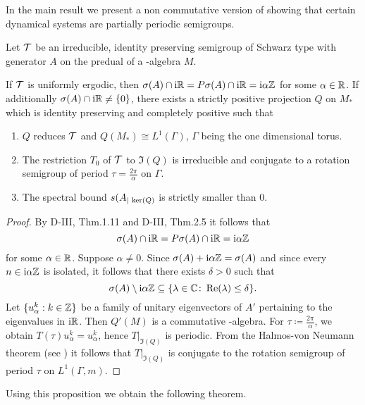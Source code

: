 In the main result we present a non commutative version of \citet{nagel:1984} showing that certain dynamical systems are partially periodic semigroups.
\begin{proposition}\label{prop:d4-3.10}
Let $ \mathcal{T} $  be an irreducible, identity preserving semigroup of Schwarz type with generator $ A $  on the predual of a \WA-algebra $ M $.

If $ \mathcal{T} $  is uniformly ergodic, then $ \sigma(A) \cap \mathrm{i}\mathbb{R} = P\sigma(A) \cap \mathrm{i}\mathbb{R} = \mathrm{i}\alpha\mathbb{Z} $  for some $ \alpha \in \mathbb{R} $.
If additionally $ \sigma(A) \cap \mathrm{i}\mathbb{R} \neq \{0\} $, there exists a strictly positive projection $ Q $  on $ M_{*} $  which is identity preserving and completely positive such that
\begin{enumerate}[\upshape (i)]
\item
$ Q $  reduces $ \mathcal{T} $  and $ Q(M_{*}) \cong L^{1}(\Gamma) $, $ \Gamma $  being the one dimensional torus.

\item
The restriction $ T_{0} $  of $ \mathcal{T} $  to $ \Im (Q) $  is irreducible and conjugate to a rotation semigroup of period $ \tau = \frac{2\pi}{\alpha} $  on $ \Gamma $.

\item
The spectral bound $ s(A_{| \mathop{}\mathrm{ker}(Q) } $  is strictly smaller than $ 0 $.
\end{enumerate}
\end{proposition}
\begin{proof}
By D-III, Thm.1.11 and D-III, Thm.2.5 it follows that
\[
\sigma(A) \cap \mathrm{i}\mathbb{R} = P\sigma(A) \cap \mathrm{i}\mathbb{R} = \mathrm{i}\alpha\mathbb{Z}
\]
for some $ \alpha \in \mathbb{R} $.
Suppose $ \alpha \neq 0 $.
Since $ \sigma(A) + \mathrm{i}\alpha\mathbb{Z} = \sigma(A) $  and since every $ n \in \mathrm{i}\alpha\mathbb{Z} $  is isolated, it follows that there exists $ \delta > 0 $  such that
\[
\sigma(A) \setminus \mathrm{i}\alpha\mathbb{Z} \subseteq \{\lambda \in \mathbb{C} \colon  \mathop{}\!\mathrm{Re}(\lambda) \leq \delta\}.
\]
Let $ \{u_{\alpha}^{k}: k \in \mathbb{Z}\} $  be a family of unitary eigenvectors of $ A' $  pertaining to the eigenvalues in $ \mathrm{i}\mathbb{R} $.
Then $ Q'(M) $  is a commutative \WA-algebra.
For $ \tau \coloneqq \frac{2\pi}{\alpha} $, we obtain $ T(\tau)u_{\alpha}^{k} = u_{\alpha}^{k} $, hence $ T|_{\Im (Q)} $  is periodic.
From the Halmos-von Neumann theorem (see \citet[Thm. III.7.11]{schaefer:1974})
it follows that $ T|_{\Im (Q)} $  is conjugate to the rotation semigroup of period $ \tau $  on $ L^{1}(\Gamma,m) $.
\end{proof}
Using this proposition we obtain the following theorem.
